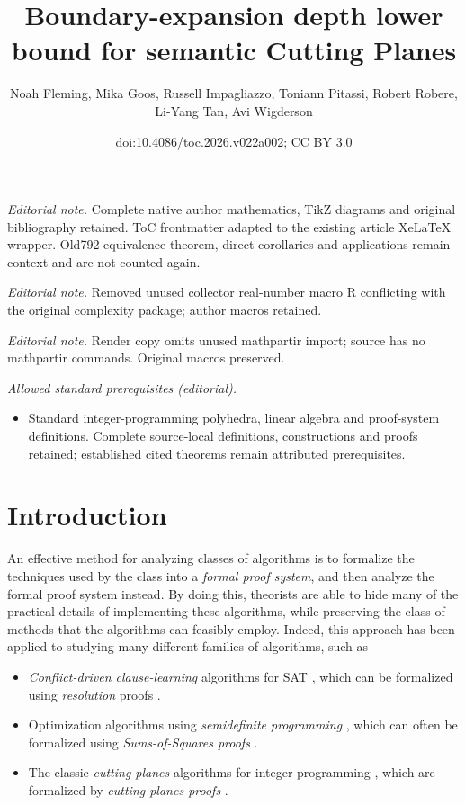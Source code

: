 \documentclass[11pt]{article}
\title{Boundary-expansion depth lower bound for semantic Cutting Planes}
\author{Noah Fleming, Mika Goos, Russell Impagliazzo, Toniann Pitassi, Robert Robere, Li-Yang Tan, Avi Wigderson}
\date{doi:10.4086/toc.2026.v022a002; CC BY 3.0}
\begin{document}
\maketitle
\noindent\textit{Editorial note.} Complete native author mathematics, TikZ diagrams and original bibliography retained. ToC frontmatter adapted to the existing article XeLaTeX wrapper. Old792 equivalence theorem, direct corollaries and applications remain context and are not counted again.\par\medskip
\noindent\textit{Editorial note.} Removed unused collector real-number macro R conflicting with the original complexity package; author macros retained.\par\medskip
\noindent\textit{Editorial note.} Render copy omits unused mathpartir import; source has no mathpartir commands. Original macros preserved.\par\medskip
\noindent\textit{Allowed standard prerequisites (editorial).}\begin{itemize}
\item Standard integer-programming polyhedra, linear algebra and proof-system definitions. Complete source-local definitions, constructions and proofs retained; established cited theorems remain attributed prerequisites.
\end{itemize}\medskip
\section{Introduction}
\label{sec:intro}
%

An effective method for analyzing classes of algorithms is to formalize the techniques used by the class into a \emph{formal proof system}, and then analyze the formal proof system instead. 
By doing this, theorists are able to hide many of the practical details of implementing these algorithms, while preserving the class of methods that the algorithms can feasibly employ.
Indeed, this approach has been applied to %
studying  %
many different families of algorithms, such as 
\begin{itemize}
\item \emph{Conflict-driven clause-learning} algorithms for SAT
\cite{BayardoS97,MarquesS99,MoskewiczMZZM01}, 
which can be formalized using \emph{resolution} proofs \cite{DavisP60}.
	\item Optimization algorithms using \emph{semidefinite programming} \cite{Goemans1994,parrilo2000}, which can often be formalized using \emph{Sums-of-Squares proofs} \cite{dima-sos,BarakBHKSZ12}.
	\item The classic \emph{cutting planes} algorithms for integer programming \cite{gomory1963algorithm,Chvatal73a}, which are formalized by \emph{cutting planes proofs} \cite{Chvatal73a, Chvatal84, CookCT87}.
\end{itemize}
\end{document}
